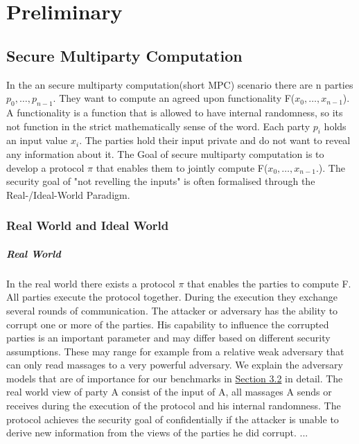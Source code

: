 \chapter{Preliminary}
\section{Secure Multiparty Computation}
In the an secure multiparty computation(short MPC) scenario there are n parties $ p_0,\dots,p_{n-1} $. They want to compute an agreed upon functionality F($ x_0,\dots,x_{n-1} $). A functionality is a function that is allowed to have internal randomness, so its not function in the strict mathematically sense of the word. 
Each party $ p_i $ holds an input value $ x_i $. 
The parties hold their input private and do not want to reveal any information about it. The Goal of secure multiparty computation is to develop a protocol  $ \pi $ that enables them to jointly compute F($ x_0,\dots,x_{n-1}. $). The security goal of "not revelling the inputs" is often formalised through the Real-/Ideal-World Paradigm. 








\subsection{Real World and Ideal World}

\paragraph{Real World}
In the real world there exists a protocol $\pi $ that enables the parties to compute F. All parties execute the protocol together. During the execution they exchange several rounds of communication. The attacker or adversary has the ability to corrupt one or more of the parties. His capability to influence the corrupted parties is an important parameter and may differ based on different security assumptions. These may range for example from a relative weak adversary that can only read massages to a very powerful adversary. We explain the adversary models that are of importance for our benchmarks in \hyperref[sec:Adversarial Models]{Section 3.2} in detail.
The real world view of party A consist of the input of A, all massages A sends or receives during the execution of the protocol and his internal randomness. The protocol achieves the security goal of confidentially if the attacker is unable to derive new information from the views of the parties he did corrupt. ...
